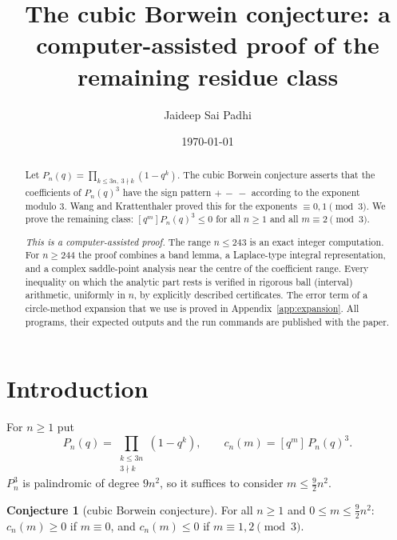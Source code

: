 \documentclass[11pt,reqno]{amsart}
\theoremstyle{plain}
\theoremstyle{definition}
\newtheorem{conjecture}[theorem]{Conjecture}
\begin{document}
\title[The cubic Borwein conjecture]{The cubic Borwein conjecture: a computer-assisted proof of the remaining residue class}
\author{Jaideep Sai Padhi}
\address{Department of Computer Science, Purdue University, West Lafayette, IN 47907, USA}
\date{\today}

\begin{abstract}
Let $P_n(q)=\prod_{k\le 3n,\ 3\nmid k}(1-q^k)$. The cubic Borwein conjecture asserts that the coefficients of $P_n(q)^3$
have the sign pattern $+\,-\,-$ according to the exponent modulo $3$. Wang and Krattenthaler proved this for the exponents
$\equiv0,1\pmod 3$. We prove the remaining class: $[q^m]P_n(q)^3\le0$ for all $n\ge1$ and all $m\equiv2\pmod 3$.

\emph{This is a computer-assisted proof.} The range $n\le243$ is an exact integer computation. For $n\ge244$ the proof
combines a band lemma, a Laplace-type integral representation, and a complex saddle-point analysis near the centre of the
coefficient range. Every inequality on which the analytic part rests is verified in rigorous ball (interval) arithmetic,
uniformly in $n$, by explicitly described certificates. The error term of a circle-method expansion that we use is proved in
Appendix~\ref{app:expansion}. All programs, their expected outputs and the run commands are published with the paper.
\end{abstract}

\maketitle

\section{Introduction}

For $n\ge1$ put
\[
P_n(q)=\prod_{\substack{k\le 3n\\ 3\nmid k}}(1-q^k),\qquad c_n(m)=[q^m]\,P_n(q)^3 .
\]
$P_n^3$ is palindromic of degree $9n^2$, so it suffices to consider $m\le\frac92n^2$.

\begin{conjecture}[cubic Borwein conjecture]\label{conj}
For all $n\ge1$ and $0\le m\le\frac92n^2$: $c_n(m)\ge0$ if $m\equiv0$, and $c_n(m)\le0$ if $m\equiv1,2\pmod 3$.
\end{conjecture}
\end{document}
